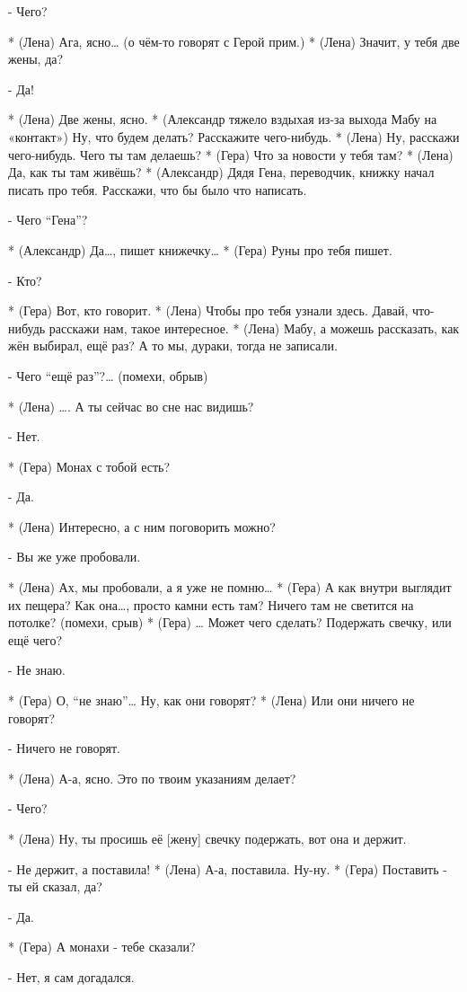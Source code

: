 - Чего?

* (Лена) Ага, ясно… (о чём-то говорят с Герой прим.)
* (Лена) Значит, у тебя две жены, да?

- Да!

* (Лена) Две жены, ясно.
* (Александр тяжело вздыхая из-за выхода Мабу на «контакт») Ну, что будем делать? Расскажите чего-нибудь. 
* (Лена) Ну, расскажи чего-нибудь. Чего ты там делаешь?
* (Гера) Что за новости у тебя там?
* (Лена) Да, как ты там живёшь?
* (Александр) Дядя Гена, переводчик, книжку начал писать про тебя. Расскажи, что бы было что написать.

- Чего “Гена”?

* (Александр) Да…, пишет книжечку…
* (Гера) Руны про тебя пишет.

- Кто?

* (Гера) Вот, кто говорит.
* (Лена) Чтобы про тебя узнали здесь. Давай, что-нибудь расскажи нам, такое интересное. 
* (Лена) Мабу, а можешь рассказать, как жён выбирал, ещё раз? А то мы, дураки, тогда не записали.

- Чего “ещё раз”?…  (помехи, обрыв) 

* (Лена) …. А ты сейчас во сне нас видишь?

- Нет.

* (Гера) Монах с тобой есть?

- Да.

* (Лена) Интересно, а с ним поговорить можно?

- Вы же уже пробовали.

* (Лена) Ах, мы пробовали, а я уже не помню…
* (Гера) А как внутри выглядит их пещера? Как она…, просто камни есть там? Ничего там не светится на потолке?  (помехи, срыв)
* (Гера) … Может чего сделать? Подержать свечку, или ещё чего?

- Не знаю.

* (Гера) О, “не знаю”… Ну, как они говорят?
* (Лена) Или они ничего не говорят?

- Ничего не говорят.

* (Лена) А-а, ясно. Это по твоим указаниям делает?

- Чего?

* (Лена) Ну, ты просишь её [жену] свечку подержать, вот она и держит.

- Не держит, а поставила!
* (Лена) А-а, поставила. Ну-ну.
* (Гера) Поставить - ты ей сказал, да?

- Да.

* (Гера) А монахи - тебе сказали?

- Нет, я сам догадался.

